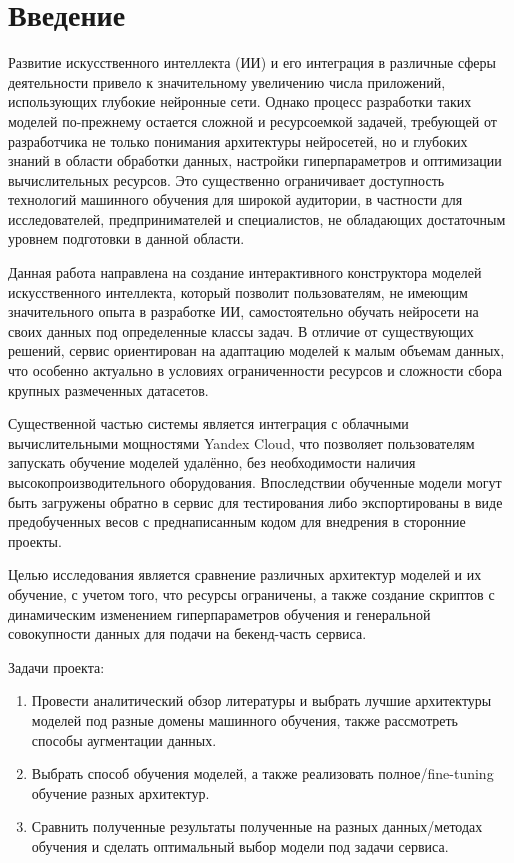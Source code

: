 \documentclass[14pt]{extarticle}
\begin{document}
\section{Введение}
\hspace{1cm}
Развитие искусственного интеллекта (ИИ) и его интеграция в различные сферы деятельности привело к значительному увеличению числа приложений, использующих глубокие нейронные сети. Однако процесс разработки таких моделей по-прежнему остается сложной и ресурсоемкой задачей, требующей от разработчика не только понимания архитектуры нейросетей, но и глубоких знаний в области обработки данных, настройки гиперпараметров и оптимизации вычислительных ресурсов. Это существенно ограничивает доступность технологий машинного обучения для широкой аудитории, в частности для исследователей, предпринимателей и специалистов, не обладающих достаточным уровнем подготовки в данной области.

Данная работа направлена на создание интерактивного конструктора моделей искусственного интеллекта, который позволит пользователям, не имеющим значительного опыта в разработке ИИ, самостоятельно обучать нейросети на своих данных под определенные классы задач. В отличие от существующих решений, сервис ориентирован на адаптацию моделей к малым объемам данных, что особенно актуально в условиях ограниченности ресурсов и сложности сбора крупных размеченных датасетов.

Существенной частью системы является интеграция с облачными вычислительными мощностями Yandex Cloud, что позволяет пользователям запускать обучение моделей удалённо, без необходимости наличия высокопроизводительного оборудования. Впоследствии обученные модели могут быть загружены обратно в сервис для тестирования либо экспортированы в виде предобученных весов с преднаписанным кодом для внедрения в сторонние проекты.

Целью исследования является сравнение различных архитектур моделей и их обучение, с учетом того, что ресурсы ограничены, а также создание скриптов с динамическим изменением гиперпараметров обучения и генеральной совокупности данных для подачи на бекенд-часть сервиса.

Задачи проекта:
\begin{enumerate}
    \item  Провести аналитический обзор литературы и выбрать лучшие архитектуры моделей под разные домены машинного обучения, также рассмотреть способы аугментации данных.
    \item  Выбрать способ обучения моделей, а также реализовать полное/fine-tuning обучение разных архитектур.
    \item Сравнить полученные результаты полученные на разных данных/методах обучения и сделать оптимальный выбор модели под задачи сервиса.
\end{enumerate}
\end{document}

